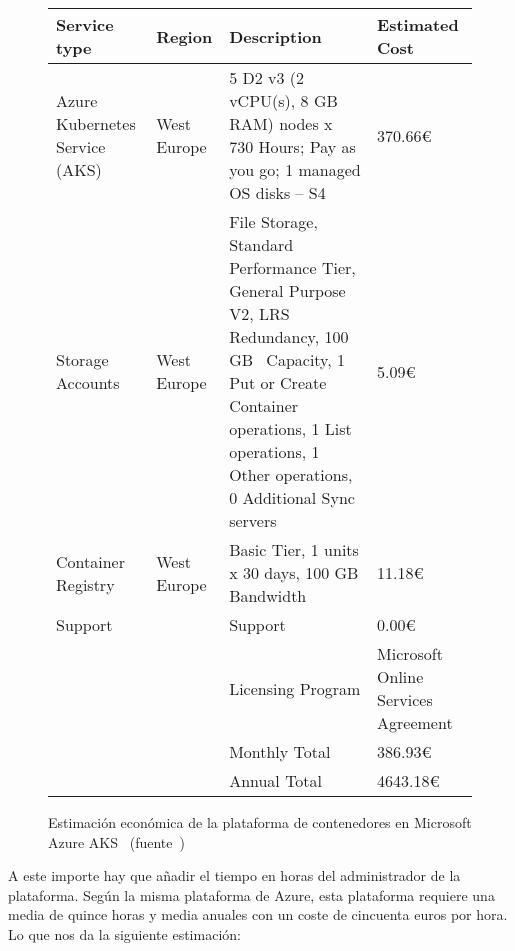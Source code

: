 \begin{figure}[!ht]
  \centering
  \begin{tabular}{|p{}|p{}|p{}|p{}|}
  \hline
  {\bf Service type}              & {\bf Region}  & {\bf Description}                                                                           & {\bf Estimated Cost}                \\
  \hline
  Azure Kubernetes Service (AKS)  & West Europe   & 5 D2 v3 (2 vCPU(s), 8 GB RAM) nodes x 730 Hours; Pay as you go; 1 managed OS disks – S4     & 370.66€                             \\
  \hline
  Storage Accounts                & West Europe   & File Storage, Standard Performance Tier, General Purpose V2, LRS Redundancy, 100 GB \
                          Capacity, 1 Put or Create Container operations, 1 List operations, 1 Other operations, 0 Additional Sync servers      & 5.09€                               \\
  \hline
  Container Registry              & West Europe   & Basic Tier, 1 units x 30 days, 100 GB Bandwidth                                             & 11.18€                              \\
  \hline
  Support                         &               & Support                                                                                     & 0.00€                               \\
  \hline
                                  &               & Licensing Program                                                                           & Microsoft Online Services Agreement \\
  \hline
                                  &               & Monthly Total                                                                               & 386.93€                             \\
  \hline
                                  &               & Annual Total                                                                                & 4643.18€                            \\
  \hline
  \end{tabular}
  \label{tabla:azurecalculatoraks}
  \caption{Estimación económica de la plataforma de contenedores en Microsoft Azure AKS~\cite{aks} (fuente~\cite{azurecalculator})}
\end{figure}

\par A este importe hay que añadir el tiempo en horas del administrador de la plataforma. Según la misma plataforma de Azure, esta plataforma requiere una media de quince horas y media anuales con un coste de cincuenta
euros por hora. Lo que nos da la siguiente estimación:

